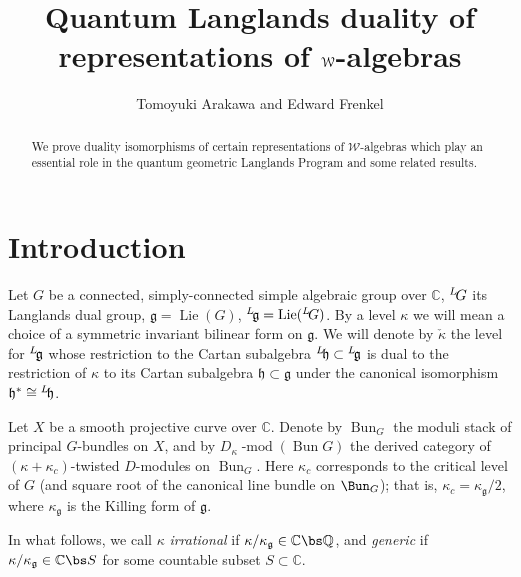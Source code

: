 \documentclass{amsart}
\title{Quantum Langlands duality of representations of ${\mc
    W}$-algebras}
\author{Tomoyuki Arakawa and Edward Frenkel}
\newcommand{\on}{\operatorname}
\newcommand{\+}{\mathop{\oplus}}
\renewcommand{\*}{{\otimes}}
\newcommand{\mc}{\mathcal}
\newcommand{\mf}{\mathfrak}
\newcommand{\g}{\mf{g}}
\newcommand{\h}{\mf{h}}
\newcommand{\C}{\mathbb{C}}
\newcommand{\Q}{\mathbb{Q}}
\def\neg{\negthinspace}
\def\lg{{}^L\neg\g}
\def\lh{{}^L\neg\h}
\def\LG{{}^L\neg G}
\theoremstyle{theorem}
\theoremstyle{remark}
\numberwithin{equation}{section}
\begin{document}
\begin{abstract}
  We prove duality isomorphisms of certain representations of ${\mc
    W}$-algebras which play an essential role in the quantum
  geometric Langlands Program and some related results.
\end{abstract}

\maketitle

\section{Introduction}

Let $G$ be a connected, simply-connected simple algebraic group over
$\C$, $\LG$ its Langlands dual group, $\g=\on{Lie}(G)$,
$\lg=\on{Lie}(\LG)$.  By a level $\kappa$ we will mean a choice of a
symmetric invariant bilinear form on $\g$. We will denote by
$\check{\kappa}$ the level for $\lg$ whose restriction to the Cartan
subalgebra $\lh \subset \lg$ is dual to the restriction of $\kappa$ to
its Cartan subalgebra $\h \subset \g$ under the canonical isomorphism
$\h^* \cong \lh$.

Let $X$ be a smooth projective curve over $\C$.  Denote by
$\on{Bun}_G$ the moduli stack of principal $G$-bundles on $X$, and by
$D_\kappa\on{-mod}(\on{Bun}G)$ the derived category of
$(\kappa+\kappa_c)$-twisted $D$-modules on $\on{Bun}_G$.  Here
$\kappa_c$ corresponds to the critical level of $G$ (and square root
of the canonical line bundle on $\Bun_G$); that is,
$\kappa_c=\kappa_\g/2$, where $\kappa_{\g}$ is the Killing form of
$\g$.

In what follows, we call $\kappa$ {\em irrational} if
$\kappa/\kappa_\g \in \C \bs \Q$, and {\em generic} if
$\kappa/\kappa_\g \in \C \bs S$ for some countable subset $S \subset
\C$.
\end{document}
